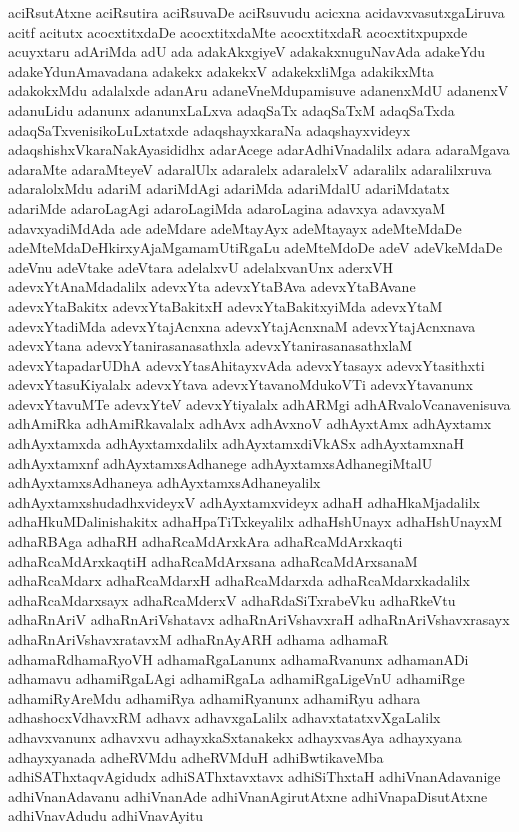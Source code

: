 {aciRsutAtxne
aciRsutira
aciRsuvaDe
aciRsuvudu
acicxna
acidavxvasutxgaLiruva
acitf
acitutx
acocxtitxdaDe
acocxtitxdaMte
acocxtitxdaR
acocxtitxpupxde
acuyxtaru
adAriMda
adU
ada
adakAkxgiyeV
adakakxnuguNavAda
adakeYdu
adakeYdunAmavadana
adakekx
adakekxV
adakekxliMga
adakikxMta
adakokxMdu
adalalxde
adanAru
adaneVneMdupamisuve
adanenxMdU
adanenxV
adanuLidu
adanunx
adanunxLaLxva
adaqSaTx
adaqSaTxM
adaqSaTxda
adaqSaTxvenisikoLuLxtatxde
adaqshayxkaraNa
adaqshayxvideyx
adaqshishxVkaraNakAyasididhx
adarAcege
adarAdhiVnadalilx
adara
adaraMgava
adaraMte
adaraMteyeV
adaralUlx
adaralelx
adaralelxV
adaralilx
adaralilxruva
adaralolxMdu
adariM
adariMdAgi
adariMda
adariMdalU
adariMdatatx
adariMde
adaroLagAgi
adaroLagiMda
adaroLagina
adavxya
adavxyaM
adavxyadiMdAda
ade
adeMdare
adeMtayAyx
adeMtayayx
adeMteMdaDe
adeMteMdaDeHkirxyAjaMgamamUtiRgaLu
adeMteMdoDe
adeV
adeVkeMdaDe
adeVnu
adeVtake
adeVtara
adelalxvU
adelalxvanUnx
aderxVH
adevxYtAnaMdadalilx
adevxYta
adevxYtaBAva
adevxYtaBAvane
adevxYtaBakitx
adevxYtaBakitxH
adevxYtaBakitxyiMda
adevxYtaM
adevxYtadiMda
adevxYtajAcnxna
adevxYtajAcnxnaM
adevxYtajAcnxnava
adevxYtana
adevxYtanirasanasathxla
adevxYtanirasanasathxlaM
adevxYtapadarUDhA
adevxYtasAhitayxvAda
adevxYtasayx
adevxYtasithxti
adevxYtasuKiyalalx
adevxYtava
adevxYtavanoMdukoVTi
adevxYtavanunx
adevxYtavuMTe
adevxYteV
adevxYtiyalalx
adhARMgi
adhARvaloVcanavenisuva
adhAmiRka
adhAmiRkavalalx
adhAvx
adhAvxnoV
adhAyxtAmx
adhAyxtamx
adhAyxtamxda
adhAyxtamxdalilx
adhAyxtamxdiVkASx
adhAyxtamxnaH
adhAyxtamxnf
adhAyxtamxsAdhanege
adhAyxtamxsAdhanegiMtalU
adhAyxtamxsAdhaneya
adhAyxtamxsAdhaneyalilx
adhAyxtamxshudadhxvideyxV
adhAyxtamxvideyx
adhaH
adhaHkaMjadalilx
adhaHkuMDalinishakitx
adhaHpaTiTxkeyalilx
adhaHshUnayx
adhaHshUnayxM
adhaRBAga
adhaRH
adhaRcaMdArxkAra
adhaRcaMdArxkaqti
adhaRcaMdArxkaqtiH
adhaRcaMdArxsana
adhaRcaMdArxsanaM
adhaRcaMdarx
adhaRcaMdarxH
adhaRcaMdarxda
adhaRcaMdarxkadalilx
adhaRcaMdarxsayx
adhaRcaMderxV
adhaRdaSiTxrabeVku
adhaRkeVtu
adhaRnAriV
adhaRnAriVshatavx
adhaRnAriVshavxraH
adhaRnAriVshavxrasayx
adhaRnAriVshavxratavxM
adhaRnAyARH
adhama
adhamaR
adhamaRdhamaRyoVH
adhamaRgaLanunx
adhamaRvanunx
adhamanADi
adhamavu
adhamiRgaLAgi
adhamiRgaLa
adhamiRgaLigeVnU
adhamiRge
adhamiRyAreMdu
adhamiRya
adhamiRyanunx
adhamiRyu
adhara
adhashocxVdhavxRM
adhavx
adhavxgaLalilx
adhavxtatatxvXgaLalilx
adhavxvanunx
adhavxvu
adhayxkaSxtanakekx
adhayxvasAya
adhayxyana
adhayxyanada
adheRVMdu
adheRVMduH
adhiBwtikaveMba
adhiSAThxtaqvAgidudx
adhiSAThxtavxtavx
adhiSiThxtaH
adhiVnanAdavanige
adhiVnanAdavanu
adhiVnanAde
adhiVnanAgirutAtxne
adhiVnapaDisutAtxne
adhiVnavAdudu
adhiVnavAyitu
}
